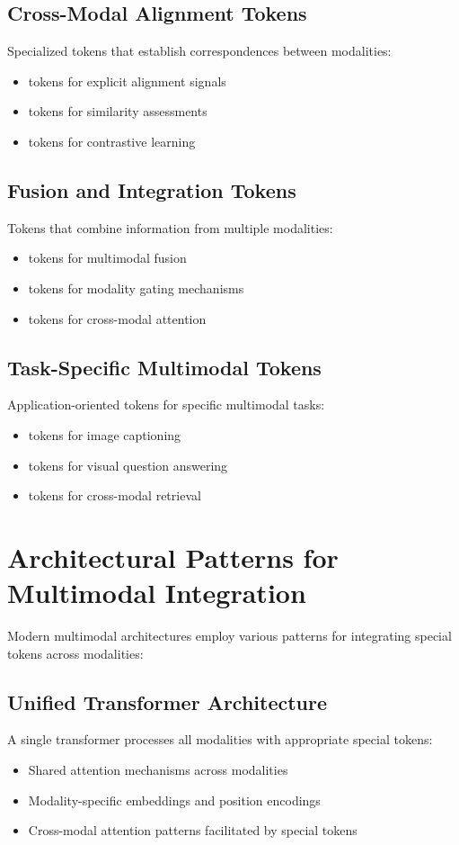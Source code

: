 \subsection{Cross-Modal Alignment Tokens}
Specialized tokens that establish correspondences between modalities:
\begin{itemize}
\item {} tokens for explicit alignment signals
\item {} tokens for similarity assessments
\item {} tokens for contrastive learning
\end{itemize}

\subsection{Fusion and Integration Tokens}
Tokens that combine information from multiple modalities:
\begin{itemize}
\item {} tokens for multimodal fusion
\item {} tokens for modality gating mechanisms
\item {} tokens for cross-modal attention
\end{itemize}

\subsection{Task-Specific Multimodal Tokens}
Application-oriented tokens for specific multimodal tasks:
\begin{itemize}
\item {} tokens for image captioning
\item {} tokens for visual question answering
\item {} tokens for cross-modal retrieval
\end{itemize}

\section{Architectural Patterns for Multimodal Integration}

Modern multimodal architectures employ various patterns for integrating special tokens across modalities:

\subsection{Unified Transformer Architecture}
A single transformer processes all modalities with appropriate special tokens:
\begin{itemize}
\item Shared attention mechanisms across modalities
\item Modality-specific embeddings and position encodings
\item Cross-modal attention patterns facilitated by special tokens
\end{itemize}

